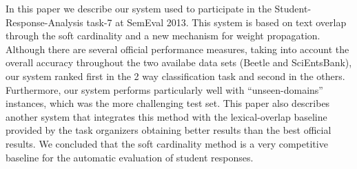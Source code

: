 In this paper we describe our system used to participate in the Student-Response-Analysis task-7 at SemEval 2013. This system is based on text
 overlap through the soft cardinality and a new mechanism for weight
 propagation. Although there are several official performance measures, taking
 into account the overall accuracy throughout the two availabe data sets (Beetle
 and SciEntsBank), our system ranked first in the 2 way classification task and
 second in the others. Furthermore, our system performs particularly well with
 ``unseen-domains'' instances, which was the more challenging test set. This
 paper also describes another system that integrates this method with the
 lexical-overlap baseline provided by the task organizers obtaining better
 results than the best official results. We concluded that the soft cardinality
 method is a very competitive baseline for the automatic evaluation of student
 responses.

